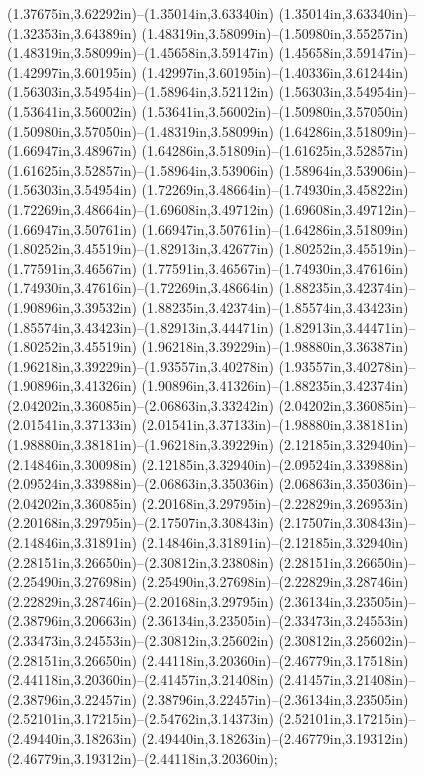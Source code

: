 (1.37675in,3.62292in)--(1.35014in,3.63340in) (1.35014in,3.63340in)--(1.32353in,3.64389in) (1.48319in,3.58099in)--(1.50980in,3.55257in) (1.48319in,3.58099in)--(1.45658in,3.59147in) (1.45658in,3.59147in)--(1.42997in,3.60195in) (1.42997in,3.60195in)--(1.40336in,3.61244in) (1.56303in,3.54954in)--(1.58964in,3.52112in) (1.56303in,3.54954in)--(1.53641in,3.56002in) (1.53641in,3.56002in)--(1.50980in,3.57050in) (1.50980in,3.57050in)--(1.48319in,3.58099in) (1.64286in,3.51809in)--(1.66947in,3.48967in) (1.64286in,3.51809in)--(1.61625in,3.52857in) (1.61625in,3.52857in)--(1.58964in,3.53906in) (1.58964in,3.53906in)--(1.56303in,3.54954in) (1.72269in,3.48664in)--(1.74930in,3.45822in) (1.72269in,3.48664in)--(1.69608in,3.49712in) (1.69608in,3.49712in)--(1.66947in,3.50761in) (1.66947in,3.50761in)--(1.64286in,3.51809in) (1.80252in,3.45519in)--(1.82913in,3.42677in) (1.80252in,3.45519in)--(1.77591in,3.46567in) (1.77591in,3.46567in)--(1.74930in,3.47616in) (1.74930in,3.47616in)--(1.72269in,3.48664in) (1.88235in,3.42374in)--(1.90896in,3.39532in) (1.88235in,3.42374in)--(1.85574in,3.43423in) (1.85574in,3.43423in)--(1.82913in,3.44471in) (1.82913in,3.44471in)--(1.80252in,3.45519in) (1.96218in,3.39229in)--(1.98880in,3.36387in) (1.96218in,3.39229in)--(1.93557in,3.40278in) (1.93557in,3.40278in)--(1.90896in,3.41326in) (1.90896in,3.41326in)--(1.88235in,3.42374in) (2.04202in,3.36085in)--(2.06863in,3.33242in) (2.04202in,3.36085in)--(2.01541in,3.37133in) (2.01541in,3.37133in)--(1.98880in,3.38181in) (1.98880in,3.38181in)--(1.96218in,3.39229in) (2.12185in,3.32940in)--(2.14846in,3.30098in) (2.12185in,3.32940in)--(2.09524in,3.33988in) (2.09524in,3.33988in)--(2.06863in,3.35036in) (2.06863in,3.35036in)--(2.04202in,3.36085in) (2.20168in,3.29795in)--(2.22829in,3.26953in) (2.20168in,3.29795in)--(2.17507in,3.30843in) (2.17507in,3.30843in)--(2.14846in,3.31891in) (2.14846in,3.31891in)--(2.12185in,3.32940in) (2.28151in,3.26650in)--(2.30812in,3.23808in) (2.28151in,3.26650in)--(2.25490in,3.27698in) (2.25490in,3.27698in)--(2.22829in,3.28746in) (2.22829in,3.28746in)--(2.20168in,3.29795in) (2.36134in,3.23505in)--(2.38796in,3.20663in) (2.36134in,3.23505in)--(2.33473in,3.24553in) (2.33473in,3.24553in)--(2.30812in,3.25602in) (2.30812in,3.25602in)--(2.28151in,3.26650in) (2.44118in,3.20360in)--(2.46779in,3.17518in) (2.44118in,3.20360in)--(2.41457in,3.21408in) (2.41457in,3.21408in)--(2.38796in,3.22457in) (2.38796in,3.22457in)--(2.36134in,3.23505in) (2.52101in,3.17215in)--(2.54762in,3.14373in) (2.52101in,3.17215in)--(2.49440in,3.18263in) (2.49440in,3.18263in)--(2.46779in,3.19312in) (2.46779in,3.19312in)--(2.44118in,3.20360in);
